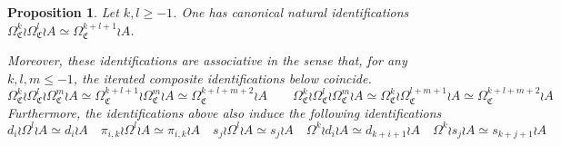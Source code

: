 \documentclass[a4paper,10pt
,draft
]{article}%
\numberwithin{equation}{section}
\numberwithin{figure}{section}
\newtheorem{proposition}[equation]{Proposition}%
\theoremstyle{definition} %
\newcommand{\1}{\ensuremath{\mathbbm 1}}%
\begin{document}
\begin{proposition}\label{ASSOCIDS PROP}
	Let $k,l\geq -1$. One has canonical natural identifications 
	$\Omega^k_{\mathfrak{C}} \wr \Omega^l_{\mathfrak{C}} \wr A
	\simeq 
	\Omega^{k+l+1}_{\mathfrak{C}} \wr A $.
	
	Moreover, these identifications are associative in the sense that, for any $k,l,m \leq -1$,
	the iterated composite identifications below coincide.
\[
	\Omega^k_{\mathfrak{C}} \wr \Omega^l_{\mathfrak{C}} \wr \Omega^m_{\mathfrak{C}} \wr A
	\simeq 
	\Omega^{k+l+1}_{\mathfrak{C}} \wr \Omega^m_{\mathfrak{C}} \wr A
	\simeq 
	\Omega^{k+l+m+2}_{\mathfrak{C}} \wr A
	\qquad
	\Omega^k_{\mathfrak{C}} \wr \Omega^l_{\mathfrak{C}} \wr \Omega^m_{\mathfrak{C}} \wr A
	\simeq 
	\Omega^{k}_{\mathfrak{C}} \wr \Omega^{l+m+1}_{\mathfrak{C}} \wr A
	\simeq 
	\Omega^{k+l+m+2}_{\mathfrak{C}} \wr A
\]
	Furthermore, the identifications above also induce the following identifications
	\[
	d_i \wr \Omega^l \wr A \simeq d_i \wr A
	\quad
	\pi_{i,k} \wr \Omega^l \wr A \simeq \pi_{i,k} \wr A
	\quad
	s_j \wr \Omega^l \wr A \simeq s_j \wr A
	\quad
	\Omega^k \wr d_i \wr A \simeq d_{k+i+1} \wr A
	\quad
	\Omega^k \wr s_j \wr A \simeq s_{k+j+1} \wr A
	\]
\end{proposition}
\end{document}
